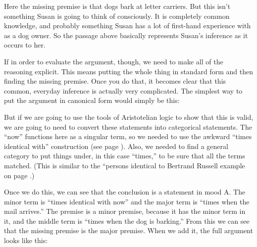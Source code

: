 Here the missing premise is that dogs bark at letter carriers. But this isn't something Susan is going to think of consciously. It is completely common knowledge, and probably something Susan has a lot of first-hand experience with as a dog owner. So the passage above basically represents Susan's inference as it occurs to her.

If in order to evaluate the argument, though, we need to make all of the reasoning explicit. This means putting the whole thing in standard form and then finding the missing premise. Once you do that, it becomes clear that this common, everyday inference is actually very complicated. The simplest way to put the argument in canonical form would simply be this:

\begin{kormanize}
\end{kormanize}

But if we are going to use the tools of Aristotelian logic to show that this is valid, we are going to need to convert these statements into categorical statements. The ``now'' functions here as a singular term, so we needed to use the awkward ``times identical with'' construction (see page \pageref{subsec:singular_propositions}). Also, we needed to find a general category to put things under, in this case ``times,'' to be sure that all the terms matched. (This is similar to the ``persons identical to Bertrand Russell example on page \pageref{finding_general_terms}.)

\begin{kormanize}
\end{kormanize}

Once we do this, we can see that the conclusion is a statement in mood A. The minor term is ``times identical with now'' and the major term is ``times when the mail arrives.'' The premise is a minor premise, because it has the minor term in it, and the middle term is ``times when the dog is barking.'' From this we can see that the missing premise is the major premise. When we add it, the full argument looks like this:

\begin{kormanize}
\end{kormanize}

